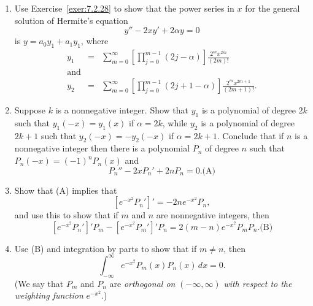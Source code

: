 \documentclass{ximera}
\begin{document}
\begin{problem}\label{exer:7.2.31}
\begin{enumerate}
\item %
Use Exercise~\ref{exer:7.2.28}  to show that the power series in $x$
for the general solution
 of Hermite's equation
$$
y''-2xy'+2\alpha y=0
$$
is $y=a_0y_1+a_1y_1$, where
\begin{eqnarray*}
y_1&=&\sum_{m=0}^\infty \left[\prod_{j=0}^{m-1}(2j-\alpha)
\right]\frac{2^mx^{2m}}{(2m)!}\\
\mbox{and}\\
y_2&=&\sum_{m=0}^\infty \left[\prod_{j=0}^{m-1}(2j+1-\alpha)
\right]\frac{2^mx^{2m+1}}{(2m+1)!}.
\end{eqnarray*}
\item %
Suppose $k$ is a nonnegative integer. Show that $y_1$ is a
polynomial of degree $2k$ such that $y_1(-x)=y_1(x)$ if $\alpha=2k$,
while $y_2$ is a polynomial of degree $2k+1$ such that
$y_2(-x)=-y_2(-x)$ if $\alpha=2k+1$. Conclude that if $n$ is a
nonnegative integer then there is a polynomial $P_n$ of degree $n$
such that $P_n(-x)=(-1)^nP_n(x)$ and
$$
P_n''-2xP_n'+2nP_n=0.
\text{(A)}
$$
\item %
Show that (A) implies that
$$
[e^{-x^2}P_n']'=-2ne^{-x^2}P_n,
$$
and use this to show that if $m$ and $n$ are nonnegative integers, then
$$
[e^{-x^2}P_n']'P_m-[e^{-x^2}P_m']'P_n=
2(m-n)e^{-x^2}P_mP_n.
\text{(B)}
$$
\item %
Use (B) and integration by parts to show that
if $m\ne n$, then
$$
\int_{-\infty}^\infty e^{-x^2}P_m(x)P_n(x)\,dx=0.
$$
(We say  that $P_m$ and $P_n$ are \emph{orthogonal on}
$(-\infty,\infty)$ \emph{ with respect to the weighting function}
$e^{-x^2}$.)
\end{enumerate}
\end{problem}
\end{document}

